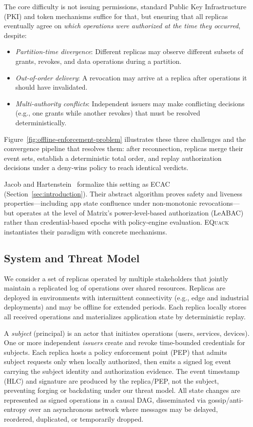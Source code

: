 \documentclass[10pt,journal,compsoc]{IEEEtran}
\newcommand{\equack}{\textsc{EQuack}}
\begin{document}
The core difficulty is not issuing permissions, standard Public Key Infrastructure (PKI) and token mechanisms suffice for that, but ensuring that all replicas eventually agree on \emph{which operations were authorized at the time they occurred}, despite:
\begin{itemize}
    \item \textit{Partition-time divergence}: Different replicas may observe different subsets of grants, revokes, and data operations during a partition.
    \item \textit{Out-of-order delivery}: A revocation may arrive at a replica after operations it should have invalidated.
    \item \textit{Multi-authority conflicts}: Independent issuers may make conflicting decisions (e.g., one grants while another revokes) that must be resolved deterministically.
\end{itemize}

\noindent Figure~\ref{fig:offline-enforcement-problem} illustrates these three challenges and the convergence pipeline that resolves them: after reconnection, replicas merge their event sets, establish a deterministic total order, and replay authorization decisions under a deny-wins policy to reach identical verdicts.

Jacob and Hartenstein~\cite{jacob2024eventuallyac} formalize this setting as ECAC (Section~\ref{sec:introduction}). Their abstract algorithm proves safety and liveness properties---including app state confluence under non-monotonic revocations---but operates at the level of Matrix's power-level-based authorization (LeABAC) rather than credential-based epochs with policy-engine evaluation. \equack{} instantiates their paradigm with concrete mechanisms.

\subsection{System and Threat Model}\label{subsec:system-model}

We consider a set of replicas operated by multiple stakeholders that jointly maintain a replicated log of operations over shared resources. Replicas are deployed in environments with intermittent connectivity (e.g., edge and industrial deployments) and may be offline for extended periods. Each replica locally stores all received operations and materializes application state by deterministic replay.

A \emph{subject} (principal) is an actor that initiates operations (users, services, devices). One or more independent \emph{issuers} create and revoke time-bounded credentials for subjects. Each replica hosts a policy enforcement point (PEP) that admits subject requests only when locally authorized, then emits a signed log event carrying the subject identity and authorization evidence. The event timestamp (HLC) and signature are produced by the replica/PEP, not the subject, preventing forging or backdating under our threat model. All state changes are represented as signed operations in a causal DAG, disseminated via gossip/anti-entropy over an asynchronous network where messages may be delayed, reordered, duplicated, or temporarily dropped.
\end{document}
